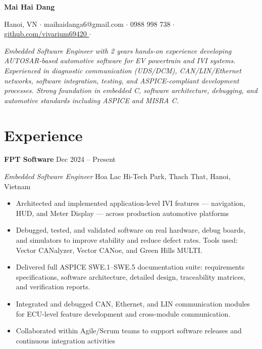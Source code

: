 \documentclass[10pt,a4paper]{article}
\begin{document}

\begin{center}
    {\LARGE \textbf{ Mai Hai Dang }} \\
    \vspace{4pt}

    Hanoi, VN
    $\cdot$
    maihaidanga6@gmail.com
    $\cdot$
    0988 998 738
    $\cdot$
    \href{https://github.com/vivarium69420}{ github.com/vivarium69420 }
    $\cdot$
    \href{https://}{  }
\end{center}

\vspace{6pt}


\noindent
\textit{ Embedded Software Engineer with 2 years hands-on experience developing AUTOSAR-based automotive software for EV powertrain and IVI systems. Experienced in diagnostic communication (UDS/DCM), CAN/LIN/Ethernet networks, software integration, testing, and ASPICE-compliant development processes. Strong foundation in embedded C, software architecture, debugging, and automotive standards including ASPICE and MISRA C. }

\vspace{8pt}


\section*{ Experience }


\textbf{ FPT Software }
\hfill
Dec 2024 -- Present

\textit{ Embedded Software Engineer }
\hfill
Hoa Lac Hi-Tech Park, Thach That, Hanoi, Vietnam

\begin{itemize}[
    leftmargin=2em,
    itemsep=2pt,
    topsep=3pt,
    label=\Large$\bullet$
]

    \item Architected and implemented application-level IVI features — navigation, HUD, and Meter Display — across production automotive platforms
    \item Debugged, tested, and validated software on real hardware, debug boards, and simulators to improve stability and reduce defect rates. Tools used: Vector CANalyzer, Vector CANoe, and Green Hills MULTI.
    \item Delivered full ASPICE SWE.1–SWE.5 documentation suite: requirements specifications, software architecture, detailed design, traceability matrices, and verification reports.
    \item Integrated and debugged CAN, Ethernet, and LIN communication modules for ECU-level feature development and cross-module communication.
    \item Collaborated within Agile/Scrum teams to support software releases and continuous integration activities

\end{itemize}
\end{document}
